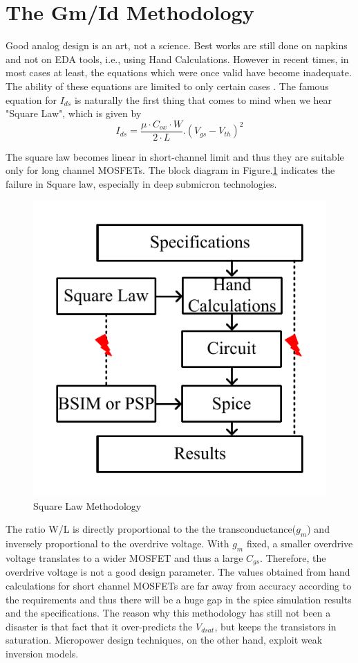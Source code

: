 \section{The Gm/Id Methodology}

Good analog design is an art, not a science. Best works are still done on napkins and not on EDA tools, i.e., using Hand Calculations. However in recent times, in most cases at least, the equations which were once valid have become inadequate. The ability of these equations are limited to only certain cases \cite{gmid_vs_sqlaw}. The famous equation for $I_{ds}$ is naturally the first thing that comes to mind when we hear "Square Law", which is given by 
$$I_{ds} = \frac{\mu \cdot C_{ox}\cdot W}{2\cdot L}.(V_{gs}-V_{th})^2$$

The square law becomes linear in short-channel limit \cite{silveira1996g} and thus they are suitable only for long channel MOSFETs. The block diagram in Figure.\ref{fig:Square_Law} \cite{boris2017systematic} indicates the failure in Square law, especially in deep submicron technologies.

\begin{figure} [H]
\centering
\includegraphics[scale=1]{Figures/Misc/PDFs/Square_Law.pdf}
\caption{Square Law Methodology}
\label{fig:Square_Law}
\end{figure}

The ratio W/L is directly proportional to the the transconductance($g_m$) and inversely proportional to the overdrive voltage. With $g_m$ fixed, a smaller overdrive voltage translates to a wider MOSFET and thus a large $C_{gs}$. Therefore, the overdrive voltage is not a good design parameter. The values obtained from hand calculations for short channel MOSFETs are far away from accuracy according to the requirements and thus there will be a huge gap in the spice simulation results and the specifications. The reason why this methodology has still not been a disaster is that fact that it over-predicts the $V_{dsat}$, but keeps the transistors in saturation. Micropower design techniques, on the other hand, exploit weak inversion models.

